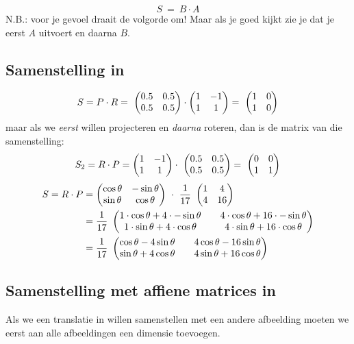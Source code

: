  \[S\ =\ B \cdot A \] 
 N.B.: voor je gevoel draait de volgorde om! Maar als je goed kijkt zie je dat je eerst $A$ uitvoert en daarna $B$.
 
\subsection{Samenstelling in \RT}
\[
  S = P\cdot R =\ \mattwee{0.5&0.5}{0.5&0.5} \cdot \mattwee{1&-1}{1&1} =\ \mattwee{1&0}{1&0} 
\]
maar als we \textit{eerst} willen  projecteren en \textit{daarna}  roteren, dan is de matrix van die samenstelling:
\[
  S_2 = R\cdot P = \mattwee{1&-1}{1&1} \cdot\ \mattwee{0.5&0.5}{0.5&0.5} =\ \mattwee{0&0}{1&1}
\]
\begin{align*} 
    S = R\cdot P &=	\mattwee{\cos\theta & -\sin\theta}{\sin\theta & \cos\theta} \ \cdot \ 
                        \frac{1}{17} \ \mattwee{1&4}{4&16}  \\
                & = \frac{1}{17} \ \mattwee{1\cdot \cos\theta + 4\cdot -\sin\theta & & 
                                            4\cdot \cos\theta + 16\cdot -\sin\theta}
                                            {1\cdot \sin\theta + 4\cdot \cos\theta &  &
                                            4\cdot \sin\theta + 16\cdot \cos\theta} \\  
                & = \frac{1}{17}\ \mattwee{\cos\theta - 4\sin\theta & & 4\cos\theta - 16\sin\theta}
                                          {\sin\theta + 4\cos\theta & & 4\sin\theta + 16\cos\theta} 
\end{align*} 

\subsection{Samenstelling met affiene matrices in \RT}
Als we een translatie in \RT willen samenstellen met een andere afbeelding moeten we eerst aan alle afbeeldingen een dimensie toevoegen.

